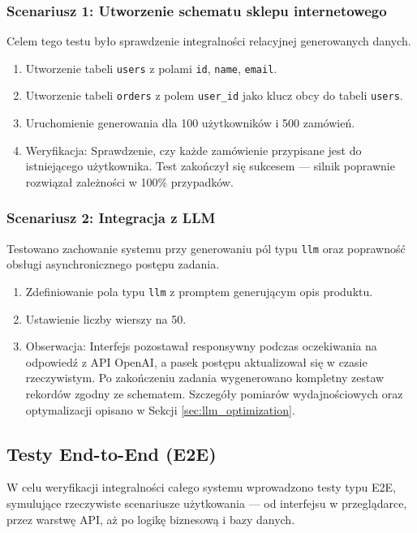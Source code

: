 \subsubsection*{Scenariusz 1: Utworzenie schematu sklepu internetowego}
Celem tego testu było sprawdzenie integralności relacyjnej generowanych danych.
\begin{enumerate}
    \item Utworzenie tabeli \texttt{users} z polami \texttt{id}, \texttt{name}, \texttt{email}.
    \item Utworzenie tabeli \texttt{orders} z polem \texttt{user\_id} jako klucz obcy do tabeli \texttt{users}.
    \item Uruchomienie generowania dla 100 użytkowników i 500 zamówień.
    \item Weryfikacja: Sprawdzenie, czy każde zamówienie przypisane jest do istniejącego użytkownika. Test zakończył się sukcesem --- silnik poprawnie rozwiązał zależności w 100\% przypadków.
\end{enumerate}

\subsubsection*{Scenariusz 2: Integracja z LLM}
Testowano zachowanie systemu przy generowaniu pól typu \texttt{llm} oraz poprawność obsługi asynchronicznego postępu zadania.
\begin{enumerate}
    \item Zdefiniowanie pola typu \texttt{llm} z promptem generującym opis produktu.
    \item Ustawienie liczby wierszy na 50.
    \item Obserwacja: Interfejs pozostawał responsywny podczas oczekiwania na odpowiedź z \gls{API} OpenAI, a pasek postępu aktualizował się w czasie rzeczywistym. Po zakończeniu zadania wygenerowano kompletny zestaw rekordów zgodny ze schematem. Szczegóły pomiarów wydajnościowych oraz optymalizacji opisano w Sekcji \ref{sec:llm_optimization}.
\end{enumerate}

\subsection*{Testy End-to-End (\texorpdfstring{\gls{E2E}}{E2E})}
W celu weryfikacji integralności całego systemu wprowadzono testy typu \gls{E2E}, symulujące rzeczywiste scenariusze użytkowania --- od interfejsu w przeglądarce, przez warstwę \gls{API}, aż po logikę biznesową i bazy danych.

